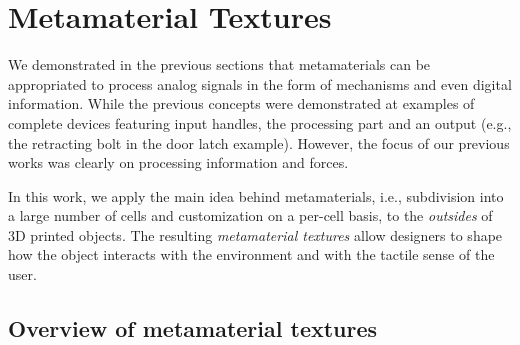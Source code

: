 \chapter{Metamaterial Textures}
\label{chapter:textures}



We demonstrated in the previous sections that metamaterials can be appropriated to process analog signals in the form of mechanisms and even digital information. While the previous concepts were demonstrated at examples of complete devices featuring input handles, the processing part and an output (e.g., the retracting bolt in the door latch example). However, the focus of our previous works was clearly on processing information and forces.

In this work, we apply the main idea behind metamaterials, i.e., subdivision into a large number of cells and customization on a per-cell basis, to the \textit{outsides} of 3D printed objects. The resulting \textit{metamaterial textures} allow designers to shape how the object interacts with the environment and with the tactile sense of the user.


\section{Overview of metamaterial textures}

